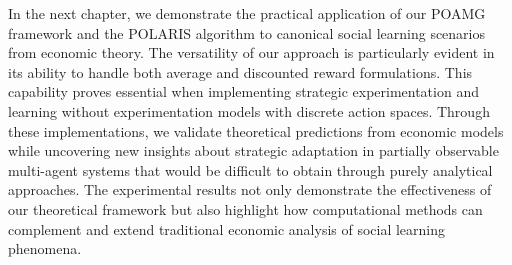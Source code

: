 In the next chapter, we demonstrate the practical application of our POAMG framework and the POLARIS algorithm to canonical social learning scenarios from economic theory. The versatility of our approach is particularly evident in its ability to handle both average and discounted reward formulations. This capability proves essential when implementing strategic experimentation and learning without experimentation models with discrete action spaces. Through these implementations, we validate theoretical predictions from economic models while uncovering new insights about strategic adaptation in partially observable multi-agent systems that would be difficult to obtain through purely analytical approaches. The experimental results not only demonstrate the effectiveness of our theoretical framework but also highlight how computational methods can complement and extend traditional economic analysis of social learning phenomena.

